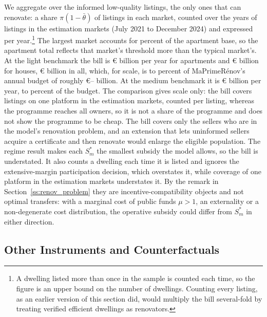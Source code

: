 \documentclass[10pt,letterpaper]{bp-template-concise}
\begin{document}
We aggregate over the informed low-quality listings, the only ones that can renovate: a share $\pi(1-\bar\theta)$ of listings in each market, counted over the \attSampleYears{} years of listings in the estimation markets (July 2021 to December 2024) and expressed per year.\footnote{A dwelling listed more than once in the sample is counted each time, so the figure is an upper bound on the number of dwellings. Counting every listing, as an earlier version of this section did, would multiply the bill several-fold by treating verified efficient dwellings as renovators.} The largest market accounts for \attTopMarketShareApt{} percent of the apartment base, so the apartment total reflects that market's threshold more than the typical market's. At the light benchmark the bill is \euro{}\attScBaseCostTwoFiftyApt{} billion per year for apartments and \euro{}\attScBaseCostTwoFiftyHouse{} billion for houses, \euro{}\attScCostBaseTotTwoFifty{} billion in all, which, for scale, is \attScCostBaseTotTwoFiftyLo{} to \attScCostBaseTotTwoFiftyHi{} percent of MaPrimeR\'enov's annual budget of roughly \euro{}\attBudgetLo{}--\attBudgetHi{} billion. %
At the medium benchmark it is \euro{}\attScCostBaseTotFiveHundred{} billion per year, \attScCostBaseTotFiveHundredLo{} to \attScCostBaseTotFiveHundredHi{} percent of the budget. The comparison gives scale only: the bill covers listings on one platform in the estimation markets, counted per listing, whereas the programme reaches all owners, so it is not a share of the programme and does not show the programme to be cheap. The bill covers only the sellers who are in the model's renovation problem, and an extension that lets uninformed sellers acquire a certificate and then renovate would enlarge the eligible population. The regime result makes each $S^*_m$ the smallest subsidy the model allows, so the bill is understated. It also counts a dwelling each time it is listed and ignores the extensive-margin participation decision, which overstates it, while coverage of one platform in the estimation markets understates it. By the remark in Section~\ref{ss:renov_problem} they are incentive-compatibility objects and not optimal transfers: with a marginal cost of public funds $\mu>1$, an externality or a non-degenerate cost distribution, the operative subsidy could differ from $S^*_m$ in either direction.

\subsection{Other Instruments and Counterfactuals}
\label{ss:att_policy}
\end{document}
